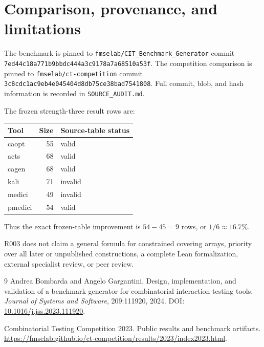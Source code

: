 \documentclass[11pt]{article}
\begin{document}
\section{Comparison, provenance, and limitations}
The benchmark is pinned to \texttt{fmselab/CIT\_Benchmark\_Generator} commit
\texttt{7ed44c18a771b9bbdc444a3c9178a7a68510a53f}. The competition comparison is
pinned to \texttt{fmselab/ct-competition} commit
\texttt{3c8cdc1ac9eb4e045404d8db75ce38bad7541808}. Full commit, blob, and hash
information is recorded in \texttt{SOURCE\_AUDIT.md}.

The frozen strength-three result rows are:
\begin{center}
\begin{tabular}{lrl}
\toprule
Tool & Size & Source-table status\\
\midrule
caopt & 55 & valid\\
acts & 68 & valid\\
cagen & 68 & valid\\
kali & 71 & invalid\\
medici & 49 & invalid\\
pmedici & 54 & valid\\
\bottomrule
\end{tabular}
\end{center}
Thus the exact frozen-table improvement is $54-45=9$ rows, or $1/6\approx16.7\%$.

R003 does not claim a general formula for constrained covering arrays, priority
over all later or unpublished constructions, a complete Lean formalization,
external specialist review, or peer review.

\begin{thebibliography}{9}
Andrea Bombarda and Angelo Gargantini.
\newblock Design, implementation, and validation of a benchmark generator for
combinatorial interaction testing tools.
\newblock \emph{Journal of Systems and Software}, 209:111920, 2024.
\newblock DOI: \href{https://doi.org/10.1016/j.jss.2023.111920}{10.1016/j.jss.2023.111920}.

Combinatorial Testing Competition 2023.
\newblock Public results and benchmark artifacts.
\newblock \url{https://fmselab.github.io/ct-competition/results/2023/index2023.html}.
\end{thebibliography}
\end{document}
